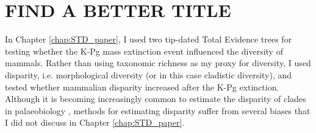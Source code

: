\section{FIND A BETTER TITLE} %

%
%

In Chapter \ref{chap:STD_paper}, I used two tip-dated Total Evidence trees for testing whether the K-Pg mass extinction event influenced the diversity of mammals.
Rather than using taxonomic richness as my proxy for diversity, I used disparity, i.e. morphological diversity (or in this case cladistic diversity), and tested whether mammalian disparity increased after the K-Pg extinction.
Although it is becoming increasingly common to estimate the disparity of clades in palaeobiology \citep[e.g.]{Butler2012,brusattedinosaur2012,toljagictriassic-jurassic2013,brusattegradual2014,bensonfaunal2014,Claddis,Close2015}, methods for estimating disparity suffer from several biases that I did not discuss in Chapter \ref{chap:STD_paper}.

